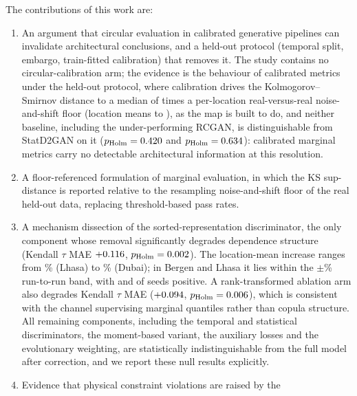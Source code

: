 \documentclass[preprint,12pt]{elsarticle}
\begin{document}
\medskip
\noindent The contributions of this work are:
\begin{enumerate}
  \item An argument that circular evaluation in calibrated generative
        pipelines can invalidate architectural conclusions, and a held-out
        protocol (temporal split, embargo, train-fitted calibration) that
        removes it.  The study contains no circular-calibration arm; the
        evidence is the behaviour of calibrated metrics under the held-out
        protocol, where calibration drives the Kolmogorov--Smirnov distance to a median
        of \ksRatioFullMedian{} times a per-location real-versus-real
        noise-and-shift floor (location means \ksRatioFullMin{} to
        \ksRatioFullMax), as the map is built to do, and neither baseline, including the under-performing RCGAN, is
        distinguishable from
        StatD2GAN on it ($p_{\mathrm{Holm}}=0.420$ and
        $p_{\mathrm{Holm}}=0.634$): calibrated marginal metrics carry no detectable architectural information
        at this resolution.
  \item A floor-referenced formulation of marginal evaluation, in
        which the KS sup-distance is reported relative to the resampling
        noise-and-shift floor of the real held-out data, replacing threshold-based
        pass rates.
  \item A mechanism dissection of the sorted-representation
        discriminator, the only component whose removal significantly
        degrades dependence structure (Kendall $\tau$ MAE
        $+0.116$, $p_{\mathrm{Holm}}=0.002$).
        The location-mean increase ranges from \pctNoDSortedTauLhasa\%
        (Lhasa) to \pctNoDSortedTauDubai\% (Dubai); in Bergen and Lhasa it
        lies within the $\pm$\runNoiseBand\% run-to-run band, with
        \nPosSeedsNoDSortedTauBergen{} and \nPosSeedsNoDSortedTauLhasa{}
        of \nSeeds{} seeds positive.  A rank-transformed ablation arm also
        degrades Kendall $\tau$ MAE ($+0.094$,
        $p_{\mathrm{Holm}}=0.006$), which is consistent with
        the channel supervising marginal quantiles rather than copula
        structure.  All remaining
        components, including the temporal and statistical discriminators,
        the moment-based variant, the auxiliary losses and the
        evolutionary weighting, are statistically
        indistinguishable from the full model after correction, and we
        report these null results explicitly.
  \item Evidence that physical constraint violations are raised by the

\end{enumerate}
\end{document}
